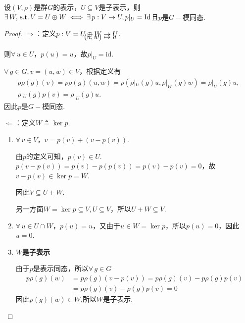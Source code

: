 \begin{theorem}[][thm:投影]
    设$(V,\rho)$是群$G$的表示，$U\subseteq V$是子表示，则$\exists\, W,\operatorname{\,\text{s.t.}} V=U\oplus W\iff\exists\, p:V\to U,p|_U=\mathrm{Id}$且$p$是$G-\!\!$模同态.
\end{theorem}
\begin{proof}
    $\Rightarrow$：定义$\setjot[-8]\begin{aligned}[t]
        p:V=U\oplus W&\to U \\
        (u,w) &\mapsto u
    \end{aligned}$.\par
    则$\forall\, u\in U$，$p(u)=u$，故$p|_U=\mathrm{id}$.\par
    $\forall\,g\in G,v=(u,w)\in V$，根据定义有
    \begin{gather*}
        p\rho(g)(v)=p\rho(g)(u,w)=p(\rho|_U(g)u,\rho|_W(g)w)=\rho|_U(g)u, \\[-6pt]
        \rho|_U(g)p(v)=\rho|_U(g)u.
    \end{gather*}
    因此$p$是$G-\!\!$模同态.\par
    $\Leftarrow$：定义$W\triangleq \ker p$.\par
    \begin{enumerate}[label=(\roman*),leftmargin=4em]
        \item {}\par
        $\forall\, v\in V$，$v=p(v)+(v-p(v))$.\par
        由$p$的定义可知，$p(v)\in U$.$p\left(v-p(v)\right)=p(v)-p(p(v))=p(v)-p(v)=0$，故$v-p(v)\in\ker p=W$.\par
        因此$V\subseteq U+W$.\par
        另一方面$W=\ker p\subseteq V,U\subseteq V$，所以$U+W \subseteq V$.
        \item {}\par
        $\forall\, u\in U\cap W$，$p(u)=u$，又由于$u\in W=\ker p$，所以$p(u)=0$，因此$u=0$.
        \item \textbf{\boldmath $W$是子表示}\par
        由于$p$是表示同态，所以$\forall\, g\in G$
        \begin{align*}
            p\rho(g)(w)&=p\rho(g)(v-p(v))=p\rho(g)(v)-p\rho(g)p(v)\\[-5pt]
            &=p\rho(g)(v)-\rho(g)p(v)=0
        \end{align*}
        因此$\rho(g)(w)\in W$,所以$W$是子表示.\qedhere
    \end{enumerate}\par
\end{proof}

